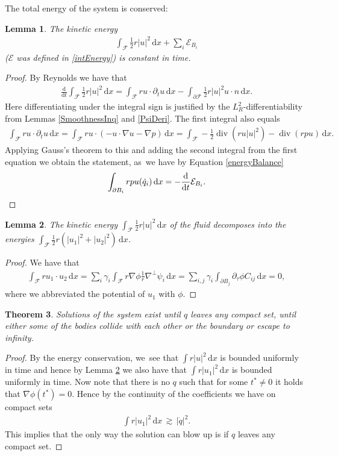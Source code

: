 \documentclass[10pt]{amsart}
\newtheorem{theorem}{Theorem}[subsection]
\newtheorem{lemma}[theorem]{Lemma}
\theoremstyle{definition}
\renewcommand{\div}{\operatorname{div}}
\newcommand\eq{=}
\newcommand\dd{\,\mathrm{d}}
\newcommand\dx{\dd x}
\let\de\partial
\begin{document}
The total energy of the system is conserved: \begin{lemma}\label{Lem:Energy}
The kinetic energy
\begin{align*}\int_{\mathcal{F}}\frac{1}{2}r|u|^2\dx+\sum_i\mathcal{E}_{B_i}
\end{align*}
($\mathcal{E}$ was defined in \eqref{intEnergy}) is constant in time.
\end{lemma}
\begin{proof}
By Reynolds we have that
\begin{align*}
\frac{\text{d}}{\text{d}t}\int_{\mathcal{F}}\frac{1}{2}r|u|^2\dx\eq\int_{\mathcal{F}}ru\cdot\de_t u\dx-\int_{\de\mathcal{F}}\frac{1}{2}r|u|^2u\cdot n\dx.
\end{align*}
Here differentiating under the integral sign is justified by the $L_R^2$-differentiability from Lemmas \ref{SmoothnessInq} and \ref{PsiDeri}. The first integral also equals
\begin{align*}
\int_{\mathcal{F}}ru\cdot\de_t u\dx\eq\int_{\mathcal{F}}ru\cdot(-u\cdot\nabla u-\nabla p)\dx\eq\int_{\mathcal{F}}-\frac{1}{2}\div(ru|u|^2)-\div(rpu)\dx.
\end{align*}
Applying Gauss's theorem to this and adding the second integral from the first equation we obtain the statement, as~we have by Equation \eqref{energyBalance}
\[
\int_{\de B_i}rpu(\dot{q}_i)\dx\eq-\frac{\text{d}}{\text{d}t}\mathcal{E}_{B_i}.\qedhere
\]
\end{proof}

\begin{lemma}\label{EnergySplitting}
The kinetic energy $\int_{\mathcal{F}}\frac{1}{2}r|u|^2\dx$ of the fluid decomposes into the energies $\int_{\mathcal{F}} \frac{1}{2}r(|u_1|^2+|u_2|^2)\dx$.
\end{lemma}
\begin{proof}
We have that
\begin{align*}
\int_{\mathcal{F}}ru_1\cdot u_2\dx\eq\sum_i\gamma_i\int_{\mathcal{F}}r\nabla\phi\frac{1}{r}\nabla^\perp\psi_i\dx\eq\sum_{i,j}\gamma_i\int_{\de B_j}\de_\tau\phi C_{ij}\dx\eq 0,
\end{align*}
where we abbreviated the potential of $u_1$ with $\phi$.
\end{proof}

\begin{theorem}\label{Thm:exist}
Solutions of the system exist until $q$ leaves any compact set, \ie until either some of the bodies collide with each other or the boundary or escape to infinity.
\end{theorem}
\begin{proof}
By the energy conservation, we~see that $\int r|u|^2\dx$ is bounded uniformly in time and hence by Lemma \ref{EnergySplitting} we also have that $\int r|u_1|^2\dx$ is bounded uniformly in time. Now note that there is no $q$ such that for some $t^*\neq 0$ it holds that $\nabla\phi(t^*)=0$. Hence by the continuity of the coefficients we have on compact sets
\begin{align*}\int r|u_1|^2\dx\,\gtrsim\, |\dot{q}|^2.
\end{align*}
This implies that the only way the solution can blow up is if $q$ leaves any compact set.
\end{proof}
\end{document}

